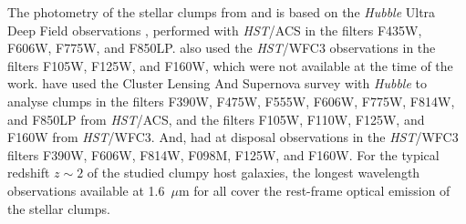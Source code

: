 \documentclass[twocolumn]{aastex61}
\begin{document}
The photometry of the stellar clumps from \citet{guo12} and \citet{elmegreen13} 
is based on the {\it Hubble} Ultra Deep Field observations 
\citep[HUDF,][]{beckwith06}, performed with {\it HST}/ACS in the filters F435W, 
F606W, F775W, and F850LP. \citet{guo12} also used the {\it HST}/WFC3 
observations in the filters F105W, F125W, and F160W, which were not available at 
the time of the \citet{elmegreen13} work. \citet{adamo13} have used the Cluster 
Lensing And Supernova survey with {\it Hubble} \citep[CLASH,][]{postman12} to 
analyse clumps in the filters F390W, F475W, F555W, F606W, F775W, F814W, and 
F850LP from {\it HST}/ACS, and the filters F105W, F110W, F125W, and F160W from 
{\it HST}/WFC3. And, \citet{wuyts14} had at disposal observations in the 
{\it HST}/WFC3 filters F390W, F606W, F814W, F098M, F125W, and F160W. 
For the typical redshift $z\sim 2$ of the studied clumpy host galaxies, the 
longest wavelength observations available at 1.6~$\mu$m for all cover the 
rest-frame optical emission of the stellar clumps.

\end{document}
